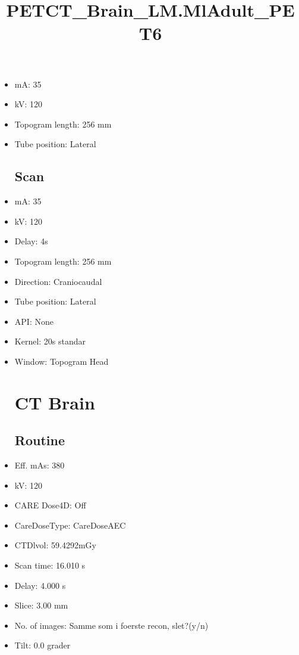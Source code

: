 \documentclass[12pt]{article}
\title{PETCT\_Brain\_LM.MlAdult\_PET6}
\begin{document}
\maketitle
\newpage
\tableofcontents
\newpage
{}


\begin{itemize}[noitemsep]\section{Topogram}
\subsection{Routine}
\item mA: 35\item kV: 120\item Topogram length: 256 mm\item Tube position: Lateral
\subsection{Scan}\item mA: 35\item kV: 120\item Delay: 4s\item Topogram length: 256 mm\item Direction: Craniocaudal\item Tube position: Lateral\item API: None\item Kernel: 20s standar\item Window: Topogram Head
\section{CT Brain}
\subsection{Routine}
\item Eff. mAs: 380\item kV: 120\item CARE Dose4D: Off\item CareDoseType: CareDoseAEC\item CTDlvol: 59.4292mGy\item Scan time: 16.010 s\item Delay: 4.000 s\item Slice: 3.00 mm\item No. of images: Samme som i foerste recon, slet?(y/n)\item Tilt: 0.0 grader

\end{itemize}
\end{document}
